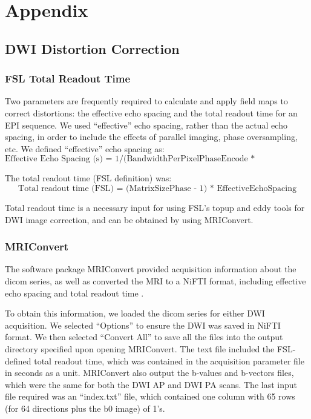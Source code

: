 
\section{Appendix}
\label{sec:Appendix}

\subsection{DWI Distortion Correction}
\label{sec:distortion}

\subsubsection{FSL Total Readout Time}

Two parameters are frequently required to calculate and apply field maps to correct distortions: the effective echo spacing and the total readout time for an EPI sequence.  We used ``effective'' echo spacing, rather than the actual echo spacing, in order to include the effects of parallel imaging, phase oversampling, etc. We defined ``effective'' echo spacing as:
\[
\text{Effective Echo Spacing (s) = 1/(BandwidthPerPixelPhaseEncode * MatrixSizePhase)}
\]

The total readout time (FSL definition) was:
\[
\text{Total readout time (FSL) = (MatrixSizePhase - 1) * EffectiveEchoSpacing}
\]

Total readout time is a necessary input for using FSL's topup and eddy tools for DWI image correction, and can be obtained by using MRIConvert. 

\subsubsection{MRIConvert}

The software package MRIConvert provided acquisition information about the dicom series, as well as converted the MRI to a NiFTI format, including effective echo spacing and total readout time \cite{ref:mriconvert}. 

To obtain this information, we loaded the dicom series for either DWI acquisition. We selected ``Options'' to ensure the DWI was saved in NiFTI format. We then selected ``Convert All'' to save all the files into the output directory specified upon opening MRIConvert. The text file included the FSL-defined total readout time, which was contained in the acquisition parameter file in seconds as a unit. MRIConvert also output the b-values and b-vectors files, which were the same for both the DWI AP and DWI PA scans. The last input file required was an ``index.txt'' file, which contained one column with 65 rows (for 64 directions plus the b0 image) of 1's.

